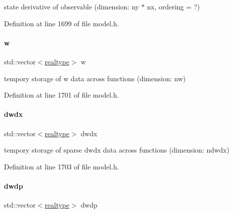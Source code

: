 state derivative of observable (dimension\+: ny $\ast$ nx, ordering = ?) 

Definition at line 1699 of file model.\+h.

\mbox{\label{classamici_1_1_model_a6b305431617db7966c726f756e819843}} 
\paragraph{\texorpdfstring{w}{w}}
{\footnotesize\ttfamily std\+::vector$<$\mbox{\hyperlink{namespaceamici_a1bdce28051d6a53868f7ccbf5f2c14a3}{realtype}}$>$ w\hspace{0.3cm}{\ttfamily [protected]}}

tempory storage of w data across functions (dimension\+: nw) 

Definition at line 1701 of file model.\+h.

\mbox{\label{classamici_1_1_model_a58b93c923b4fd9c0322c969954696210}} 
\paragraph{\texorpdfstring{dwdx}{dwdx}}
{\footnotesize\ttfamily std\+::vector$<$\mbox{\hyperlink{namespaceamici_a1bdce28051d6a53868f7ccbf5f2c14a3}{realtype}}$>$ dwdx\hspace{0.3cm}{\ttfamily [protected]}}

tempory storage of sparse dwdx data across functions (dimension\+: ndwdx) 

Definition at line 1703 of file model.\+h.

\mbox{\label{classamici_1_1_model_ae0be4b469deded11a9b2569a4da9edea}} 
\paragraph{\texorpdfstring{dwdp}{dwdp}}
{\footnotesize\ttfamily std\+::vector$<$\mbox{\hyperlink{namespaceamici_a1bdce28051d6a53868f7ccbf5f2c14a3}{realtype}}$>$ dwdp\hspace{0.3cm}{\ttfamily [protected]}}

